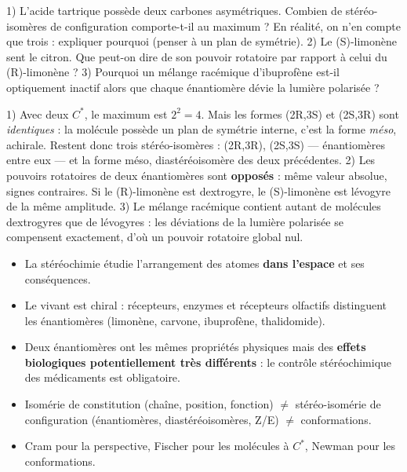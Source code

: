 \documentclass[11pt]{article}
\begin{document}
\begin{exercice}
1) L'acide tartrique  possède deux carbones asymétriques. Combien de stéréo-isomères de configuration comporte-t-il au maximum ? En réalité, on n'en compte que trois : expliquer pourquoi (penser à un plan de symétrie).
2) Le (S)-limonène sent le citron. Que peut-on dire de son pouvoir rotatoire par rapport à celui du (R)-limonène ?
3) Pourquoi un mélange racémique d'ibuprofène est-il optiquement inactif alors que chaque énantiomère dévie la lumière polarisée ?
\end{exercice}

\begin{corrige}[Exercice]
1) Avec deux $C^*$, le maximum est $2^2 = 4$. Mais les formes (2R,3S) et (2S,3R) sont \emph{identiques} : la molécule possède un plan de symétrie interne, c'est la forme \emph{méso}, achirale. Restent donc trois stéréo-isomères : (2R,3R), (2S,3S) — énantiomères entre eux — et la forme méso, diastéréoisomère des deux précédentes.
2) Les pouvoirs rotatoires de deux énantiomères sont \textbf{opposés} : même valeur absolue, signes contraires. Si le (R)-limonène est dextrogyre, le (S)-limonène est lévogyre de la même amplitude.
3) Le mélange racémique contient autant de molécules dextrogyres que de lévogyres : les déviations de la lumière polarisée se compensent exactement, d'où un pouvoir rotatoire global nul.
\end{corrige}

\begin{aretenir}
\begin{itemize}
\item La stéréochimie étudie l'arrangement des atomes \textbf{dans l'espace} et ses conséquences.
\item Le vivant est chiral : récepteurs, enzymes et récepteurs olfactifs distinguent les énantiomères (limonène, carvone, ibuprofène, thalidomide).
\item Deux énantiomères ont les mêmes propriétés physiques mais des \textbf{effets biologiques potentiellement très différents} : le contrôle stéréochimique des médicaments est obligatoire.
\item Isomérie de constitution (chaîne, position, fonction) $\neq$ stéréo-isomérie de configuration (énantiomères, diastéréoisomères, Z/E) $\neq$ conformations.
\item Cram pour la perspective, Fischer pour les molécules à $C^*$, Newman pour les conformations.
\end{itemize}
\end{aretenir}
\end{document}
